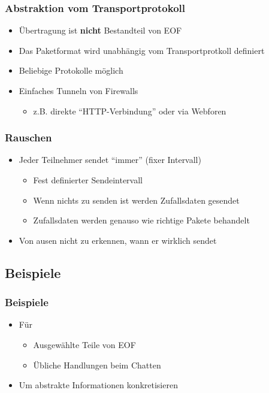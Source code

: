 \documentclass{beamer}
\begin{document}
\frame
{
  \frametitle{Abstraktion vom Transportprotokoll}

  \begin{itemize}
  \item \"Ubertragung ist \textbf{nicht} Bestandteil von EOF
  \pause
  \item Das Paketformat wird unabh\"angig vom Transportprotkoll definiert
  \pause
  \item Beliebige Protokolle m\"oglich
  \pause
  \item Einfaches Tunneln von Firewalls
  \pause
  \begin{itemize}
  \item z.B. direkte "`HTTP-Verbindung"' oder via Webforen
  \end{itemize}
  \end{itemize}
}


\frame
{
  \frametitle{Rauschen}

  \begin{itemize}
  \item Jeder Teilnehmer sendet "`immer"' (fixer Intervall)
  \pause
  \begin{itemize}
  \item Fest definierter Sendeintervall
  \pause
  \item Wenn nichts zu senden ist werden Zufallsdaten gesendet
  \pause
  \item Zufallsdaten werden genauso wie richtige Pakete behandelt
  \pause
  \end{itemize}
  \item Von ausen nicht zu erkennen, wann er wirklich sendet
  \end{itemize}
}


\subsection{Beispiele}
\frame
{
  \frametitle{Beispiele}

  \begin{itemize}
  \item F\"ur
  \pause
  \begin{itemize}
  \item Ausgew\"ahlte Teile von EOF
  \pause
  \item \"Ubliche Handlungen beim Chatten
  \pause
  \end{itemize}
  \item Um abstrakte Informationen konkretisieren
  \end{itemize}
}
\end{document}
